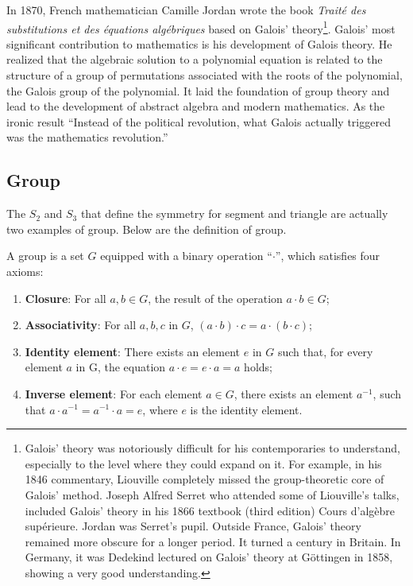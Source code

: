 \documentclass[b5paper]{article}
\begin{document}
In 1870, French mathematician Camille Jordan wrote the book {\em Traité des substitutions et des équations algébriques} based on Galois' theory\footnote{Galois' theory was notoriously difficult for his contemporaries to understand, especially to the level where they could expand on it. For example, in his 1846 commentary, Liouville completely missed the group-theoretic core of Galois' method. Joseph Alfred Serret who attended some of Liouville's talks, included Galois' theory in his 1866 textbook (third edition) Cours d'algèbre supérieure. Jordan was Serret's pupil. Outside France, Galois' theory remained more obscure for a longer period. It turned a century in Britain. In Germany, it was Dedekind lectured on Galois' theory at Göttingen in 1858, showing a very good understanding.}. Galois' most significant contribution to mathematics is his development of Galois theory. He realized that the algebraic solution to a polynomial equation is related to the structure of a group of permutations associated with the roots of the polynomial, the Galois group of the polynomial. It laid the foundation of group theory and lead to the development of abstract algebra and modern mathematics. As the ironic result ``Instead of the political revolution, what Galois actually triggered was the mathematics revolution\cite{StepanovRose15}.''

\subsection{Group}

The $S_2$ and $S_3$ that define the symmetry for segment and triangle are actually two examples of group. Below are the definition of group.

\begin{definition} A group is a set $G$ equipped with a binary operation ``$\cdot$'', which satisfies four axioms:

\begin{enumerate}
\item \textbf{Closure}: For all $a, b \in G$, the result of the operation $a \cdot b \in G$;
\item \textbf{Associativity}: For all $a, b, c$ in $G$, $(a \cdot b) \cdot c = a \cdot (b \cdot c)$;
\item \textbf{Identity element}: There exists an element $e$ in $G$ such that, for every element $a$ in G, the equation $a \cdot e = e \cdot a = a$ holds;
\item \textbf{Inverse element}: For each element $a \in G$, there exists an element $a^{-1}$, such that $a \cdot a^{-1} = a^{-1} \cdot a = e$, where $e$ is the identity element.
\end{enumerate}
\end{definition}
\end{document}
